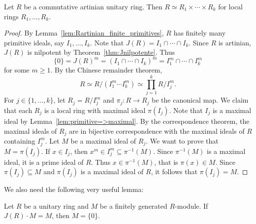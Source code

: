 
\begin{lemma}
\label{lem:artinian_local}
    Let $R$ be a commutative artinian unitary ring. Then 
    $R\simeq R_1\times\cdots\times R_k$ for local rings $R_1,\dots,R_k$. 
\end{lemma}


\begin{proof}
    By Lemma~\ref{lem:Rartinian_finite_primitives}, $R$ has finitely many primitive ideals, say 
    $I_1,\dots,I_k$. Note that $J(R)=I_1\cap\cdots\cap I_k$. 
    Since $R$ is artinian, $J(R)$ is nilpotent by Theorem~\ref{thm:Jnilpotente}. Thus
    \[
    \{0\}=J(R)^m=(I_1\cap\cdots\cap I_k)^m=I_1^m\cap\cdots\cap I_k^m
    \]
    for some $m\geq1$. By the Chinese remainder theorem, 
    \[
    R\simeq R/(I_1^m\cdots I_k^m)\simeq \prod_{j=1}^k R/I_j^m.
    \]
    For $j\in\{1,\dots,k\}$, let $R_j=R/I_j^m$ and 
    $\pi_j\colon R\to R_j$ be the canonical map. 
    We claim that each $R_j$ is a local ring 
    with maximal ideal $\pi(I_j)$. Note that $I_j$ is a maximal ideal by 
    Lemma~\ref{lem:primitive=>maximal}. 
    By the correspondence theorem, the maximal ideals of $R_j$ are in bijective 
    correspondence with
    the maximal ideals of $R$ containing $I_j^m$. 
    Let $M$ be a maximal ideal of $R_j$. We want to prove that $M=\pi(I_j)$. 
    If $x\in I_j$, then $x^m\in I_j^m\subseteq\pi^{-1}(M)$. Since $\pi^{-1}(M)$ is a maximal ideal, 
    it is a prime ideal of $R$. Thus $x\in\pi^{-1}(M)$, that is $\pi(x)\in M$. 
    Since $\pi(I_j)\subseteq M$ and $\pi(I_j)$ is a maximal ideal of $R$, it follows
    that $\pi(I_j)=M$. 
\end{proof}

We also need the following very useful lemma:

\begin{lemma}[Nakayama]
	\label{lem:Nakayama}
	Let $R$ be a unitary ring and $M$ be 
    a finitely generated $R$-module. 
    If $J(R)\cdot M=M$, then $M=\{0\}$.
\end{lemma}

